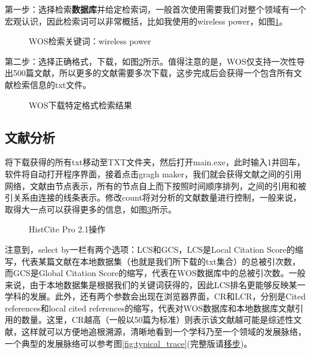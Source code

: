 \documentclass[UTF8]{ctexbook}
\begin{document}
第一步：选择检索{\bf 数据库}并给定检索词，一般首次使用需要我们对整个领域有一个宏观认识，因此检索词可以非常概括，比如我使用的wireless power，如图\ref{fig:1}。

\begin{figure}[!htb]
	\centering
	\vspace{-0.3cm}
	\caption{WOS检索关键词：wireless power}\label{fig:1}
\end{figure}

第二步：选择正确格式，下载，如图\ref{fig:2}所示。值得注意的是，WOS仅支持一次性导出500篇文献，所以更多的文献需要多次下载，这步完成后会获得一个包含所有文献检索信息的txt文件。

\begin{figure}[!htb]
	\centering
	\vspace{-0.3cm}
	\caption{WOS下载特定格式检索结果}\label{fig:2}
\end{figure}

\subsection{文献分析}
将下载获得的所有txt移动至TXT文件夹，然后打开main.exe，此时输入1并回车，软件将自动打开程序界面，接着点击gragh maker，我们就会获得文献之间的引用网络，文献由节点表示，所有的节点自上而下按照时间顺序排列，之间的引用和被引关系由连接的线条表示。修改count将对分析的文献数量进行控制，一般来说，取得大一点可以获得更多的信息，如图\ref{fig:3}所示。

\begin{figure}[!htb]
	\centering
	\vspace{-0.3cm}
	\caption{HistCite Pro 2.1操作}\label{fig:3}
\end{figure}


注意到，select by一栏有两个选项：LCS和GCS，LCS是Local Citation Score的缩写，代表某篇文献在本地数据集（也就是我们所下载的txt集合）的总被引次数，而GCS是Global Citation Score的缩写，代表在WOS数据库中的总被引次数。一般来说，由于本地数据集是根据我们的关键词获得的，因此LCS排名更能够反映某一学科的发展。此外，还有两个参数会出现在浏览器界面，CR和LCR，分别是Cited references和local cited references的缩写，代表对WOS数据库和本地数据库文献引用的数量。这里，CR越高（一般以50篇为标准）则表示该文献越可能是综述性文献，这样就可以方便地追根溯源，清晰地看到一个学科乃至一个领域的发展脉络，一个典型的发展脉络可以参考图\ref{fig:typical_trace}(完整版请\href{https://raw.githubusercontent.com/lonelybag/Latex_lonelybag/V1.0/Script/002_NOTE_of_MASTER/Figure/typical_trace_full.jpg}{移步})。
\end{document}
